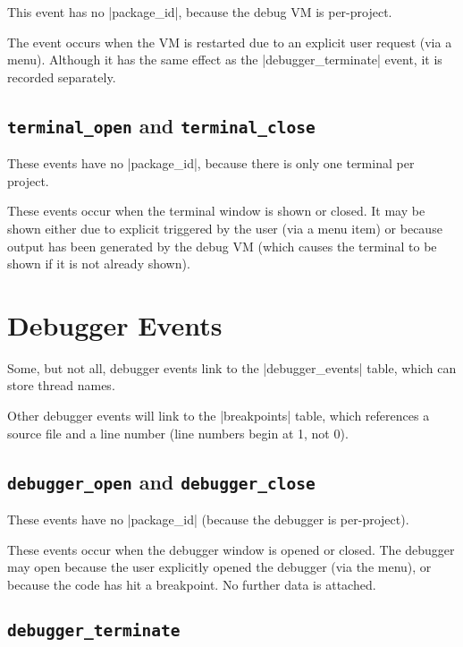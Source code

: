\documentclass{book}
\begin{document}
This event has no |package_id|, because the debug VM is per-project.

The event occurs when the VM is restarted due to an explicit user request (via
a menu).  Although it has the same effect as the |debugger_terminate| event,
it is recorded separately.

\subsection{\lstinline|terminal_open| and \lstinline|terminal_close|}

These events have no |package_id|, because there is only one terminal
per project.

These events occur when the terminal window is shown or closed.  It
may be shown either due to explicit triggered by the user (via a menu
item) or because output has been generated by the debug VM (which
causes the terminal to be shown if it is not already shown).

\section{Debugger Events}

Some, but not all, debugger events link to the |debugger_events|
table, which can store thread names.


Other debugger events will link to the |breakpoints| table, which references a
source file and a line number (line numbers begin at 1, not 0).


\subsection{\lstinline|debugger_open| and \lstinline|debugger_close|}

These events have no |package_id| (because the debugger is per-project).

These events occur when the debugger window is opened or closed.  The debugger
may open because the user explicitly opened the debugger (via the menu), or
because the code has hit a breakpoint.  No further data is attached.

\subsection{\lstinline|debugger_terminate|}
\end{document}
